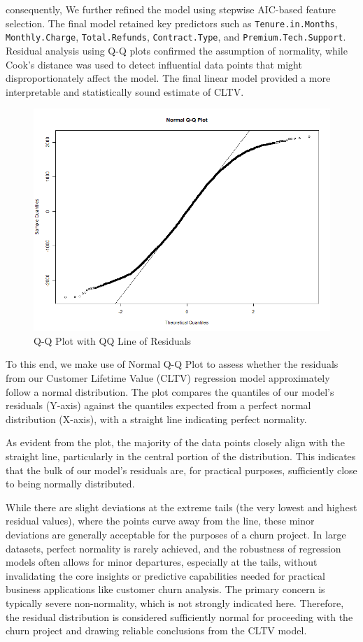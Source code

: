 \documentclass[
]{article}
\begin{document}
consequently, We further refined the model using stepwise AIC-based
feature selection. The final model retained key predictors such as
\texttt{Tenure.in.Months}, \texttt{Monthly.Charge},
\texttt{Total.Refunds}, \texttt{Contract.Type}, and
\texttt{Premium.Tech.Support}. Residual analysis using Q-Q plots
confirmed the assumption of normality, while Cook's distance was used to
detect influential data points that might disproportionately affect the
model. The final linear model provided a more interpretable and
statistically sound estimate of CLTV.

\begin{figure}

{\centering \includegraphics[width=0.85\linewidth]{Plots/qqline_plot} 

}

\caption{Q-Q Plot with QQ Line of Residuals}\label{fig:qqline-img}
\end{figure}

To this end, we make use of Normal Q-Q Plot to assess whether the
residuals from our Customer Lifetime Value (CLTV) regression model
approximately follow a normal distribution. The plot compares the
quantiles of our model's residuals (Y-axis) against the quantiles
expected from a perfect normal distribution (X-axis), with a straight
line indicating perfect normality.

As evident from the plot, the majority of the data points closely align
with the straight line, particularly in the central portion of the
distribution. This indicates that the bulk of our model's residuals are,
for practical purposes, sufficiently close to being normally
distributed.

While there are slight deviations at the extreme tails (the very lowest
and highest residual values), where the points curve away from the line,
these minor deviations are generally acceptable for the purposes of a
churn project. In large datasets, perfect normality is rarely achieved,
and the robustness of regression models often allows for minor
departures, especially at the tails, without invalidating the core
insights or predictive capabilities needed for practical business
applications like customer churn analysis. The primary concern is
typically severe non-normality, which is not strongly indicated here.
Therefore, the residual distribution is considered sufficiently normal
for proceeding with the churn project and drawing reliable conclusions
from the CLTV model.
\end{document}
